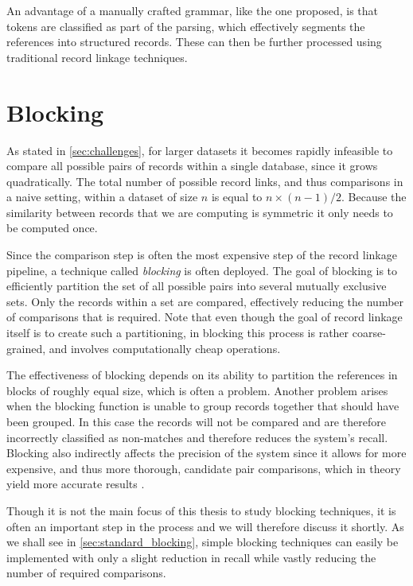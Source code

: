 An advantage of a manually crafted grammar, like the one proposed, is that tokens are classified as part of the parsing, which effectively segments the references into structured records.
These can then be further processed using traditional record linkage techniques.




\section{Blocking}
\label{sec:blocking}

As stated in \cref{sec:challenges}, for larger datasets it becomes rapidly infeasible to compare all possible pairs of records within a single database, since it grows quadratically.
The total number of possible record links, and thus comparisons in a naive setting, within a dataset of size $n$ is equal to $n\times(n-1)/2$.
Because the similarity between records that we are computing is symmetric it only needs to be computed once.

Since the comparison step is often the most expensive step of the record linkage pipeline, a technique called \emph{blocking} is often deployed.
The goal of blocking is to efficiently partition the set of all possible pairs into several mutually exclusive sets.
Only the records within a set are compared, effectively reducing the number of comparisons that is required.
Note that even though the goal of record linkage itself is to create such a partitioning, in blocking this process is rather coarse-grained, and involves computationally cheap operations.

The effectiveness of blocking depends on its ability to partition the references in blocks of roughly equal size, which is often a problem.
Another problem arises when the blocking function is unable to group records together that should have been grouped.
In this case the records will not be compared and are therefore incorrectly classified as non-matches and therefore reduces the system's recall.
Blocking also indirectly affects the precision of the system since it allows for more expensive, and thus more thorough, candidate pair comparisons, which in theory yield more accurate results \citep{Baxter2003}.

Though it is not the main focus of this thesis to study blocking techniques, it is often an important step in the process and we will therefore discuss it shortly.
As we shall see in \cref{sec:standard_blocking}, simple blocking techniques can easily be implemented with only a slight reduction in recall while vastly reducing the number of required comparisons.


